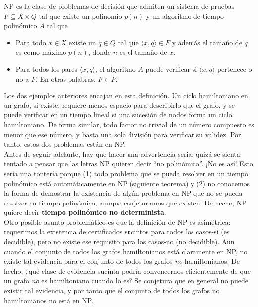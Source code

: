 \begin{fondo}
\label{eq:def} 
NP es la clase de problemas de decisión que admiten un sistema de pruebas $F \subseteq X \times Q$ tal que existe un polinomio $p(n)$ y un algoritmo de tiempo polinómico $A$ tal que
\begin{itemize}
\item Para todo $x \in X$ existe un $q \in Q$ tal que $\langle x, q \rangle \in F$ y además el tamaño de $q$ es como máximo $p(n)$, donde $n$ es el tamaño de $x$.
\item Para todos los pares $\langle x, q \rangle$, el algoritmo $A$ puede verificar si $\langle x, q \rangle$ pertenece o no a $F$. En otras palabras, $F \in P$.
\end{itemize}
\end{fondo}

Los dos ejemplos anteriores encajan en esta definición. Un ciclo hamiltoniano en un grafo, si existe, requiere menos espacio para describirlo que el grafo, y se puede verificar en un tiempo lineal si una sucesión de nodos forma un ciclo hamiltoniano. De forma similar, todo factor no trivial de un número compuesto es menor que ese número, y basta una sola división para verificar su validez. Por tanto, estos dos problemas están en NP.\\

Antes de seguir adelante, hay que hacer una advertencia seria: quizá se sienta tentado a pensar que las letras NP quieren decir ``no polinómico''. ¡No es así! Esto sería una tontería porque (1) todo problema que se pueda resolver en un tiempo polinómico está automáticamente en NP (siguiente teorema) y (2) no conocemos la forma de demostrar la existencia de algún problema en NP que no se pueda resolver en tiempo polinómico, aunque conjeturamos que existen. De hecho, NP quiere decir \textbf{tiempo polinómico no determinista}.\\

Otro posible asunto problemático es que la definición de NP es asimétrica: requerimos la existencia de certificados sucintos para todos los casos-si (es decidible), pero no existe ese requisito para los casos-no (no decidible). Aun cuando el conjunto de todos los grafos hamiltonianos está claramente en NP, no existe tal evidencia para el conjunto de todos los grafos \emph{no} hamiltonianos. De hecho, ¿qué clase de evidencia sucinta podría convencernos eficientemente de que un grafo \emph{no} es hamiltoniano cuando lo es? Se conjetura que en general no puede existir tal evidencia, y por tanto que el conjunto de todos los grafos no hamiltonianos no está en NP.

